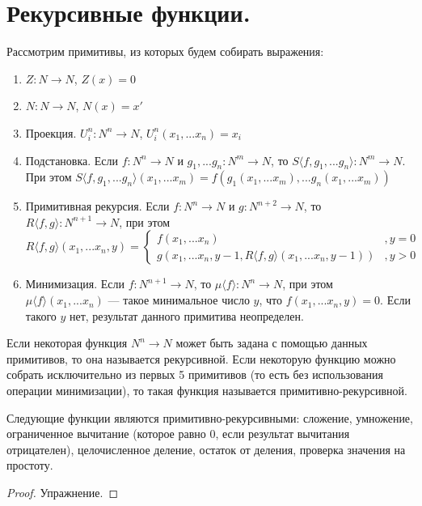 \section{Рекурсивные функции.}

Рассмотрим примитивы, из которых будем собирать выражения:

\begin{enumerate}
\item $Z: N \rightarrow N$, $Z(x) = 0$
\item $N: N \rightarrow N$, $N(x) = x'$
\item Проекция. $U^n_i: N^n \rightarrow N$, $U^n_i (x_1, ... x_n) = x_i$
\item Подстановка. Если $f: N^n \rightarrow N$ и $g_1, ... g_n: N^m \rightarrow N$, 
  то $S\langle{}f,g_1,...g_n\rangle: N^m \rightarrow N$.
При этом $S\langle{}f,g_1,...g_n\rangle (x_1,...x_m) = f(g_1(x_1,...x_m), ... g_n(x_1,...x_m))$
\item Примитивная рекурсия. Если $f: N^n \rightarrow N$ и $g: N^{n+2} \rightarrow N$, то
  $R\langle{}f,g\rangle: N^{n+1} \rightarrow N$, при этом
  $$R\langle{}f,g\rangle (x_1,...x_n,y) = \left\{\begin{array}{ll}
    f(x_1,...x_n) & , y = 0\\
    g(x_1,...x_n,y-1,R\langle{}f,g\rangle(x_1,...x_n,y-1)) &, y > 0
  \end{array}\right.$$
\item Минимизация. Если $f: N^{n+1} \rightarrow N$, то $\mu \langle{}f\rangle: N^n \rightarrow N$, при этом
  $\mu \langle{}f\rangle (x_1,...x_n)$ --- такое минимальное число $y$, что $f(x_1,...x_n,y) = 0$.
  Если такого $y$ нет, результат данного примитива неопределен.
\end{enumerate}

Если некоторая функция $N^n \rightarrow N$ может быть задана с помощью данных примитивов, 
то она называется рекурсивной. Если некоторую функцию можно собрать исключительно из первых 
5 примитивов (то есть без использования операции минимизации), то такая функция называется 
примитивно-рекурсивной. 

\begin{theorem}Следующие функции являются примитивно-рекурсивными:
сложение, умножение, ограниченное вычитание 
(которое равно 0, если результат вычитания отрицателен),
целочисленное деление, остаток от деления, проверка значения на
простоту.
\end{theorem}

\begin{proof}Упражнение.\end{proof}

